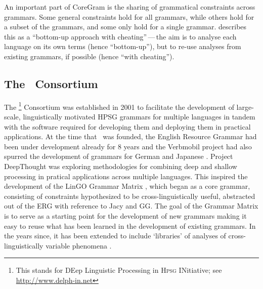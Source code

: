 \documentclass[output=paper,nonflat]{langsci/langscibook}
\begin{document}
An important part of CoreGram is the sharing of grammatical constraints across grammars.
Some general constraints hold for all grammars,
while others hold for a subset of the grammars,
and some only hold for a single grammar.
\citet{MuellerCoreGram} describes this as a ``bottom-up approach with cheating''\,---\,the aim is to analyse each language on its own terms (hence ``bottom-up''),
but to re-use analyses from existing grammars, if possible (hence ``with cheating'').



\subsection{The \delphin\ Consortium}
\label{cl:delphin}

The \delphin\footnote{This stands for DEep Linguistic
  Processing in \textsc{Hpsg} INitiative; see \url{http://www.delph-in.net}} Consortium
was established in 2001 to facilitate the development of large-scale,
linguistically motivated HPSG grammars for multiple languages in tandem
with the software required for developing them and deploying them in
practical applications. At the time that \delphin\ was founded, the
English Resource Grammar
\citep[ERG;][]{Flickinger2000a,Flickinger2011a-u} had been under
development already for 8 years and the Verbmobil project
\citep{Wahlster:00} had also spurred the development of grammars for
German \citep[GG;][]{Mue:Kap:00,Crysmann2003b} and Japanese
\citep[Jacy;][]{SBB2016a}. Project DeepThought
\citep{Callmeier-etal:2004} was exploring methodologies for combining
deep and shallow processing in pratical applications across multiple
languages. This inspired the development of the LinGO Grammar Matrix
\citep{BFO2002a-u}, which began as a core grammar, consisting of
constraints hypothesized to be cross-linguistically useful, abstracted
out of the ERG with reference to Jacy and GG. The goal of the Grammar
Matrix is to serve as a starting point for the development of new
grammars making it easy to reuse what has been learned in the
development of existing grammars. In the years since, it has been
extended to include `libraries' of analyses of cross-linguistically
variable phenomena
\citep[\eg][]{Drellishak2009a-u,BDFPS2010a-u}.
\end{document}
